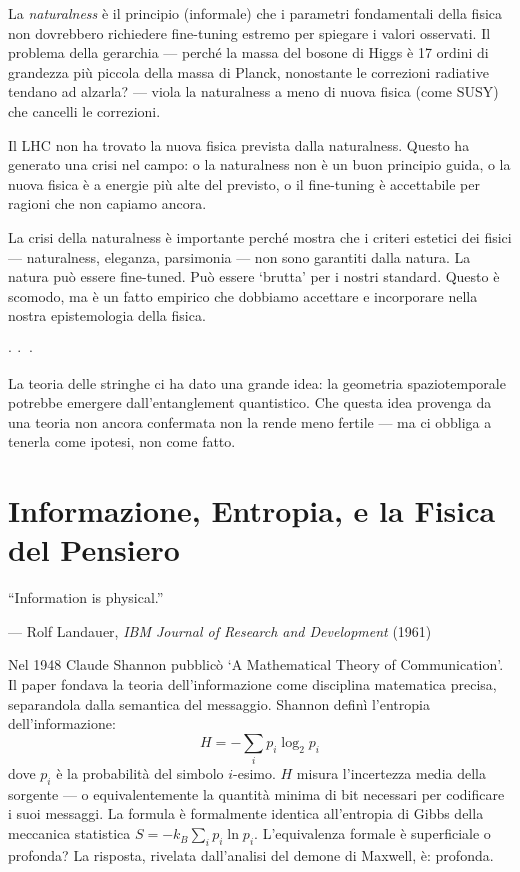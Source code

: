 \documentclass[12pt,a4paper,openany]{book}
\newcommand{\sezione}[1]{\vspace{1.2em}{\large\bfseries #1}\vspace{0.5em}\par}
\newcommand{\puntini}{\begin{center}$\cdot\ \cdot\ \cdot$\end{center}\vspace{0.3em}}
\begin{document}
La \textit{naturalness} è il principio (informale) che i parametri fondamentali della fisica non dovrebbero richiedere fine-tuning estremo per spiegare i valori osservati. Il problema della gerarchia --- perché la massa del bosone di Higgs è 17 ordini di grandezza più piccola della massa di Planck, nonostante le correzioni radiative tendano ad alzarla? --- viola la naturalness a meno di nuova fisica (come SUSY) che cancelli le correzioni.

Il LHC non ha trovato la nuova fisica prevista dalla naturalness. Questo ha generato una crisi nel campo: o la naturalness non è un buon principio guida, o la nuova fisica è a energie più alte del previsto, o il fine-tuning è accettabile per ragioni che non capiamo ancora.

La crisi della naturalness è importante perché mostra che i criteri estetici dei fisici --- naturalness, eleganza, parsimonia --- non sono garantiti dalla natura. La natura può essere fine-tuned. Può essere `brutta' per i nostri standard. Questo è scomodo, ma è un fatto empirico che dobbiamo accettare e incorporare nella nostra epistemologia della fisica.

\puntini

La teoria delle stringhe ci ha dato una grande idea: la geometria spaziotemporale potrebbe emergere dall'entanglement quantistico. Che questa idea provenga da una teoria non ancora confermata non la rende meno fertile --- ma ci obbliga a tenerla come ipotesi, non come fatto.

\chapter{Informazione, Entropia, e la Fisica del Pensiero}

\epigraph{``Information is physical.''}{--- Rolf Landauer, \textit{IBM Journal of Research and Development} (1961)}

\sezione{Shannon e la nascita della teoria dell'informazione}

Nel 1948 Claude Shannon pubblicò `A Mathematical Theory of Communication'. Il paper fondava la teoria dell'informazione come disciplina matematica precisa, separandola dalla semantica del messaggio. Shannon definì l'entropia dell'informazione:
\[
H = -\sum_i p_i \log_2 p_i
\]
dove $p_i$ è la probabilità del simbolo $i$-esimo. $H$ misura l'incertezza media della sorgente — o equivalentemente la quantità minima di bit necessari per codificare i suoi messaggi. La formula è formalmente identica all'entropia di Gibbs della meccanica statistica $S = -k_B \sum_i p_i \ln p_i$. L'equivalenza formale è superficiale o profonda? La risposta, rivelata dall'analisi del demone di Maxwell, è: profonda.
\end{document}
